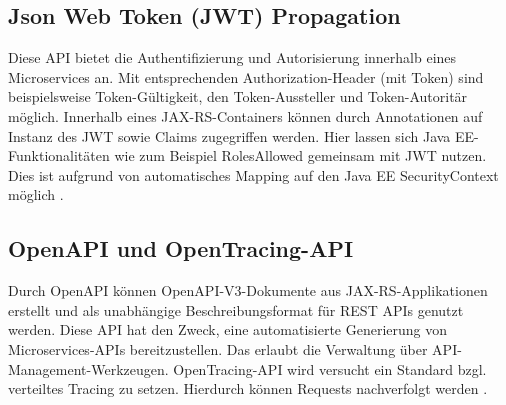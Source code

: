 \subsection{Json Web Token (JWT) Propagation}
Diese API bietet die Authentifizierung und Autorisierung innerhalb eines Microservices an. Mit entsprechenden Authorization-Header (mit Token) sind beispielsweise Token-Gültigkeit, den Token-Aussteller und Token-Autoritär möglich. Innerhalb eines JAX-RS-Containers können durch Annotationen auf Instanz des JWT sowie Claims zugegriffen werden. Hier lassen sich Java EE-Funktionalitäten wie zum Beispiel RolesAllowed gemeinsam mit JWT nutzen. Dies ist aufgrund von automatisches Mapping auf den Java EE SecurityContext möglich \cite{LarsRowekamp.2017c}. 


\subsection{OpenAPI und OpenTracing-API}
Durch OpenAPI können OpenAPI-V3-Dokumente aus JAX-RS-Applikationen erstellt und als unabhängige Beschreibungsformat für REST APIs genutzt werden. Diese API hat den Zweck, eine automatisierte Generierung von Microservices-APIs bereitzustellen. Das erlaubt die Verwaltung über API-Management-Werkzeugen.
OpenTracing-API wird versucht ein Standard bzgl. verteiltes Tracing zu setzen. Hierdurch können Requests nachverfolgt werden \cite{DominikMohilo2018}.  

